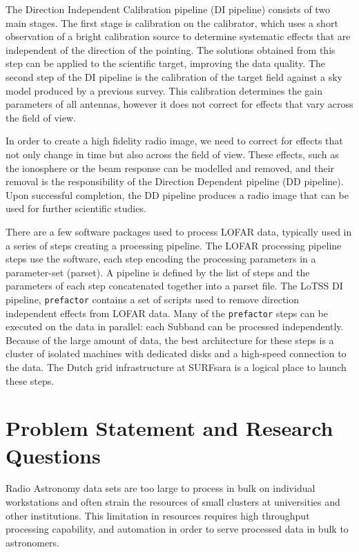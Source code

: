 The Direction Independent Calibration pipeline (DI pipeline) consists of two main stages. The first stage is calibration on the calibrator, which uses a short observation of a bright calibration source to determine systematic effects that are independent of the direction of the pointing. The solutions obtained from this step can be applied to the scientific target, improving the data quality. The second step of the DI pipeline is the calibration of the target field against a sky model produced by a previous survey. This calibration determines the gain parameters of all antennas, however it does not correct for effects that vary across the field of view. 
 
In order to create a high fidelity radio image, we need to correct for effects that not only change in time but also across the field of view. These effects, such as the ionosphere or the beam response can be modelled and removed, and their removal is the responsibility of the Direction Dependent pipeline (DD pipeline). Upon successful completion, the DD pipeline produces a radio image that can be used for further scientific studies.

There are a few software packages used to process LOFAR data, typically used in a series of steps creating a processing pipeline. The LOFAR processing pipeline steps use the software, each step encoding the processing parameters in a parameter-set (parset). A pipeline is defined by the list of steps and the parameters of each step concatenated together into a parset file. The LoTSS DI pipeline, \texttt{prefactor} contains a set of scripts used to remove direction independent effects from LOFAR data. Many of the \texttt{prefactor} steps can be executed on the data in parallel: each Subband can be processed independently. Because of the large amount of data, the best architecture for these steps is a cluster of isolated machines with dedicated disks and a high-speed connection to the data. The Dutch grid infrastructure at SURFsara is a logical place to launch these steps. 


\section{Problem Statement and Research Questions}

Radio Astronomy data sets are too large to process in bulk on individual workstations and often strain the resources of small clusters at universities and other institutions. This limitation in resources requires high throughput processing capability, and automation in order to serve processed data in bulk to astronomers. 

